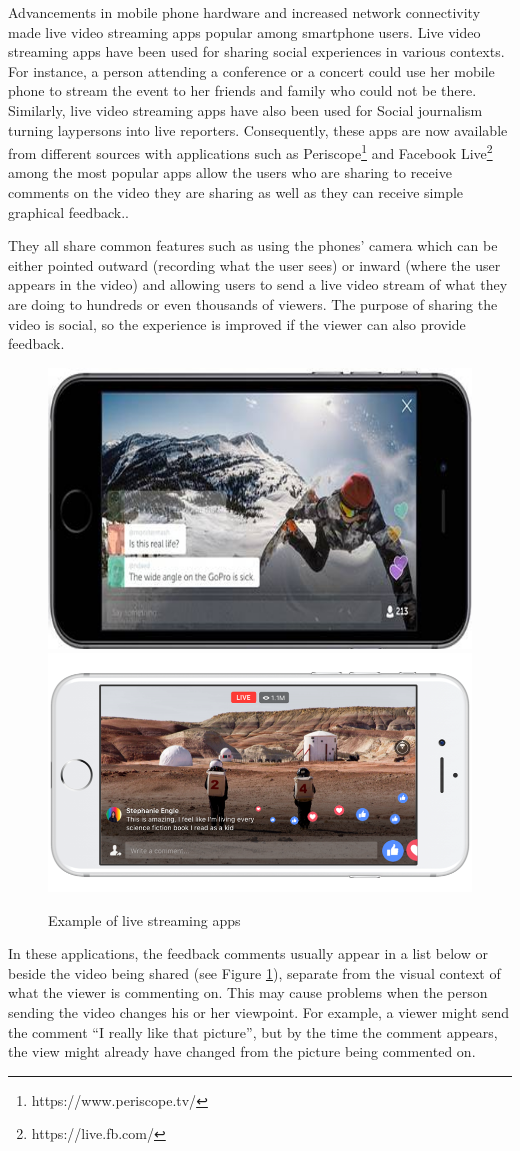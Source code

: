 Advancements in mobile phone hardware and increased network connectivity made live video streaming apps popular among smartphone users. Live video streaming apps have been used for sharing social experiences in various contexts. For instance, a person attending a conference or a concert could use her mobile phone to stream the event to her friends and family who could not be there. Similarly, live video streaming apps have also been used for Social journalism turning laypersons into live reporters. Consequently, these apps are now available from different sources with applications such as Periscope\footnote{https://www.periscope.tv/} and Facebook Live\footnote{https://live.fb.com/} among the most popular apps allow the users who are sharing to receive comments on the video they are sharing as well as they can receive simple graphical feedback.. 

They all share common features such as using the phones' camera which can be either pointed outward (recording what the user sees) or inward (where the user appears in the video) and allowing users to send a live video stream of what they are doing to hundreds or even thousands of viewers. The purpose of sharing the video is social, so the experience is improved if the viewer can also provide feedback.

\begin{figure}
    \centering
    \includegraphics[width=.4\linewidth]{images/periscope.png}
    \includegraphics[width=.4\linewidth]{images/facebook-live.png}
    \caption{Example of live streaming apps}
    \label{fig:live-streaming}
\end{figure}

In these applications, the feedback comments usually appear in a list below or beside the video being shared (see Figure \ref{fig:live-streaming}), separate from the visual context of what the viewer is commenting on. This may cause problems when the person sending the video changes his or her viewpoint. For example, a viewer might send the comment “I really like that picture”, but by the time the comment appears, the view might already have changed from the picture being commented on.


